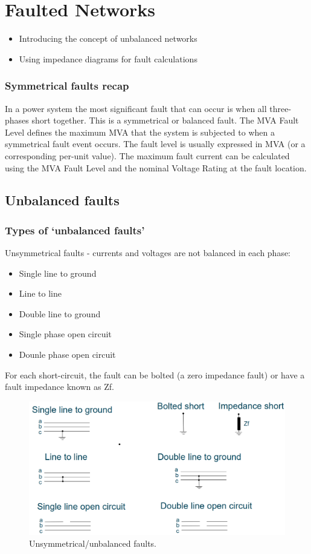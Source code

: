 \chapter{Faulted Networks}
\begin{itemize}
	\item Introducing the concept of unbalanced networks
	\item Using impedance diagrams for fault calculations
\end{itemize}
\subsection{Symmetrical faults recap}
In a power system the most significant fault that can occur is when all three-phases short together. This is a symmetrical or balanced fault. The MVA Fault Level defines the maximum MVA that the system is subjected to when a symmetrical fault event occurs. The fault level is usually expressed in MVA (or a corresponding per-unit value). The maximum fault current can be calculated using the MVA Fault Level and the nominal Voltage Rating at the fault location.
\section{Unbalanced faults}
\subsection{Types of `unbalanced faults'}
Unsymmetrical faults - currents and voltages are not balanced in each phase:
\begin{itemize}
	\item Single line to ground
	\item Line to line
	\item Double line to ground
	\item Single phase open circuit
	\item Dounle phase open circuit
\end{itemize}
For each short-circuit, the fault can be bolted (a zero impedance fault) or have a fault impedance known as Zf.
\begin{figure}[H]
	\centering
	\includegraphics[width = \textwidth]{./img/figure20.png}
	\caption{Unsymmetrical/unbalanced faults.}
\end{figure}
